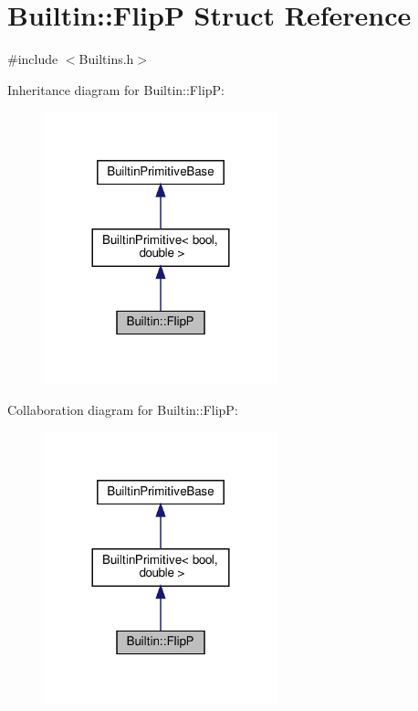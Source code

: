 \hypertarget{struct_builtin_1_1_flip_p}{}\section{Builtin\+:\+:FlipP Struct Reference}
\label{struct_builtin_1_1_flip_p}


{\ttfamily \#include $<$Builtins.\+h$>$}



Inheritance diagram for Builtin\+:\+:FlipP\+:\nopagebreak
\begin{figure}[H]
\begin{center}
\leavevmode
\includegraphics[width=192pt]{struct_builtin_1_1_flip_p__inherit__graph}
\end{center}
\end{figure}


Collaboration diagram for Builtin\+:\+:FlipP\+:\nopagebreak
\begin{figure}[H]
\begin{center}
\leavevmode
\includegraphics[width=192pt]{struct_builtin_1_1_flip_p__coll__graph}
\end{center}
\end{figure}
